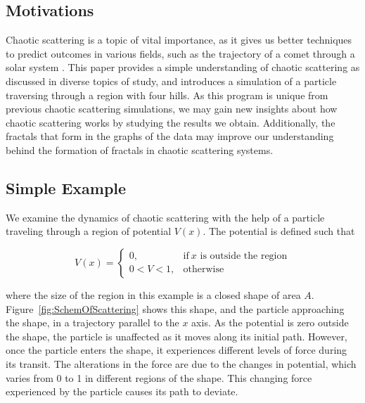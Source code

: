 \documentclass[12pt]{article} %
\begin{document}

\subsection{Motivations} \label{Intro:Motivations}


Chaotic scattering is a topic of vital importance, as it gives us better techniques to predict outcomes in various fields, such as the trajectory of a comet through a solar system \cite{chaoticIntro}. This paper provides a simple understanding of chaotic scattering as discussed in diverse topics of study, and introduces a simulation of a particle traversing through a region with four hills. As this program is unique from previous chaotic scattering simulations, we may gain new insights about how chaotic scattering works by studying the results we obtain. Additionally, the fractals that form in the graphs of the data may improve our understanding  behind the formation of fractals in chaotic scattering systems. 



\subsection{Simple Example} \label{Intro:SimpleExample} %
We examine the dynamics of chaotic scattering with the help of a particle traveling through a region of potential $V(x)$. The potential is defined such that

\begin{equation}
V(x)=
\begin{cases}
0, & \text{if}\ x \text{ is outside the region} \\
0<V<1, & \text{otherwise}
\end{cases}
\end{equation}

\noindent where the size of the region in this example is a closed shape of area $A$. Figure~\ref{fig:SchemOfScattering} shows this shape, and the particle approaching the shape, in a trajectory parallel to the $x$ axis. As the potential is zero outside the shape, the particle is unaffected as it moves along its initial path. However, once the particle enters the shape, it experiences different levels of force during its transit. The alterations in the force are due to the changes in potential, which varies from 0 to 1 in different regions of the shape. This changing force experienced by the particle causes its path to deviate. \\
\end{document}
